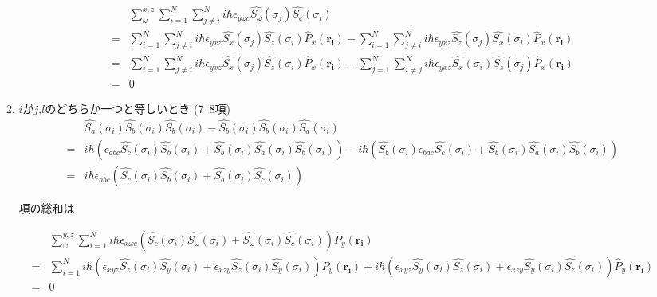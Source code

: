 \documentclass{article}
\begin{document}
\begin{enumerate}
\begin{enumerate}
        
        \begin{equation}
        \begin{split}
        \label{}
        &\sum_{\omega}^{x,z}\sum_{i=1}^{N} \sum_{j\neq i}^{N} i\hbar \epsilon_{y \omega c}\hat{S_{\omega}}{(\sigma_j)} \hat{S_c}(\sigma_i)\\  
        =&\sum_{i=1}^{N} \sum_{j\neq i}^{N} i\hbar \epsilon_{y xz}\hat{S_{x}}{(\sigma_j)} \hat{S_z}(\sigma_i) {\hat{P}_x}{(\boldsymbol{r_i})} - \sum_{i=1}^{N} \sum_{j\neq i}^{N} i\hbar \epsilon_{yxz}\hat{S_{z}}{(\sigma_j)} \hat{S_x}(\sigma_i) {\hat{P}_x}{(\boldsymbol{r_i})}\\ 
        =&\sum_{i=1}^{N} \sum_{j\neq i}^{N} i\hbar \epsilon_{yxz}\hat{S_{x}}{(\sigma_j)} \hat{S_z}(\sigma_i) {\hat{P}_x}{(\boldsymbol{r_i})} - \sum_{j=1}^{N} \sum_{i\neq j}^{N} i\hbar \epsilon_{yxz}\hat{S_{x}}{(\sigma_i)} \hat{S_z}(\sigma_j) {\hat{P}_x}{(\boldsymbol{r_i})}\\ 
        =&0
        \end{split}
        \end{equation}
        \item  $i$が$j$,$l$のどちらか一つと等しいとき (7~8項)
        \begin{equation}
            \begin{split}
            \label{}
            &{\hat{S_a}}(\sigma_i) \hat{S_{b}}{(\sigma_i)} \hat{S_{b}}{(\sigma_i)} -  \hat{S_{b}}{(\sigma_i)} \hat{S_{b}}{(\sigma_i)} {\hat{S_a}}(\sigma_i)\\
        =& i\hbar\left(\epsilon_{abc}\hat{S_c}(\sigma_i) \hat{S_{b}}{(\sigma_i)} + {\hat{S_b}}(\sigma_i) \hat{S_{a}}{(\sigma_i)} \hat{S_{b}}{(\sigma_i)} \right)- 
         i\hbar\left( \hat{S_{b}}{(\sigma_i)} \epsilon_{bac}\hat{S_c}(\sigma_i)  + {\hat{S_b}}(\sigma_i) \hat{S_{a}}{(\sigma_i)} \hat{S_{b}}{(\sigma_i)} \right)\\
        =&i\hbar\epsilon_{abc} \left(\hat{S_c}(\sigma_i) \hat{S_{b}}{(\sigma_i)}+ \hat{S_{b}}{(\sigma_i)} \hat{S_c}(\sigma_i) \right)
        \end{split}
        \end{equation}
        
        
        項の総和は
        
        \begin{equation}
        \begin{split}
        \label{}
        &\sum_{\omega}^{y,z}\sum_{i=1}^{N}  i\hbar\epsilon_{x \omega c}\left(\hat{S_c}(\sigma_i) \hat{S_{\omega}}{(\sigma_i)}+ \hat{S_{\omega}}{(\sigma_i)} \hat{S_c}(\sigma_i) \right)  {\hat{P}_y}{(\boldsymbol{r_i})}\\
        =&\sum_{i=1}^{N}  i\hbar \left(\epsilon_{x y z}\hat{S_z}(\sigma_i) \hat{S_y}{(\sigma_i)}+\epsilon_{x z y}\hat{S_z}(\sigma_i) \hat{S_y}{(\sigma_i)}\right) {\hat{P}_y}{(\boldsymbol{r_i})}+ i\hbar \left(\epsilon_{x y z}\hat{S_y}(\sigma_i) \hat{S_z}{(\sigma_i)}+\epsilon_{x z y}\hat{S_y}(\sigma_i) \hat{S_z}{(\sigma_i)}\right) {\hat{P}_y}{(\boldsymbol{r_i})}\\
        =&0
        \end{split}
        \end{equation}
        

\end{enumerate}
\end{enumerate}
\end{document}
